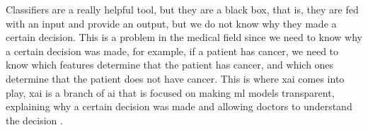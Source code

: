 
Classifiers are a really helpful tool, but they are a black box, that is, they are fed with an input and provide an output, but we do not know why they made a certain decision. This is a problem in the medical field since we need to know why a certain decision was made, for example, if a patient has cancer, we need to know which features determine that the patient has cancer, and which ones determine that the patient does not have cancer. This is where \ac{xai} comes into play, \ac{xai} is a branch of \ac{ai} that is focused on making \ac{ml} models transparent, explaining why a certain decision was made and allowing doctors to understand the decision \cite{borys_explainable_2023}.